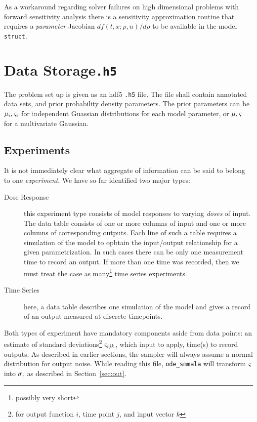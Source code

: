 \documentclass[utf8,english,DIV=12,12pt]{scrartcl}
\newcommand{\standard}[1]{\textsf{#1}}
\newcommand{\stdv}[1]{\ensuremath{\ifthenelse{\equal{#1}{g}}{\varsigma}{\sigma}}}
\begin{document}
As a workaround regarding solver failures on high dimensional problems
with forward sensitivity analysis there is a sensitivity approximation
routine that requires a \emph{parameter} Jacobian
$df(t,x;\rho,u)/d\rho$ to be available in the model \texttt{struct}.

\section{Data Storage\hfill\texttt{.h5}}
\label{sec:data}

The problem set up is given as an \standard{hdf5} \texttt{.h5} file. The
file shall contain annotated data sets, and prior probability density
parameters. The prior parameters can be $\mu_i,\stdv{g}_i$ for
independent Guassian distributions for each model parameter, or
$\mu,\stdv{g}$ for a multivariate Gaussian.

\subsection{Experiments}
\label{sec:exp}

It is not immediately clear what aggregate of information can be said
to belong to one \emph{experiment}. We have so far identified two
major types:
\begin{description}
\item[Dose Response] this experiment type consists of model responses
  to varying \emph{doses} of input. The data table consists of one or
  more columns of input and one or more columns of corresponding
  outputs. Each line of such a table requires a simulation of the
  model to opbtain the input/output relationship for a given
  parametrization. In such cases there can be only one measurement
  time to record an output. If more than one time was recorded, then
  we must treat the case as many\footnote{possibly very short} time
  series experiments.
\item[Time Series] here, a data table describes one simulation of the
  model and gives a record of an output measured at discrete
  timepoints. 
\end{description}

Both types of experiment have mandatory components aside from data
points: an estimate of standard deviations\footnote{for output
  function $i$, time point $j$, and input vector $k$} $\stdv{g}_{ijk}$,
which input to apply, time(s) to record outputs. As described in
earlier sections, the sampler will always assume a normal distribution
for output noise. While reading this file, \texttt{ode\_smmala} will transform $\stdv{g}$ into $\stdv{h}$, as described in Section~\ref{sec:out}.
\end{document}
